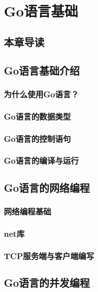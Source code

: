 \chapter{Go语言基础}

\section{本章导读}

\section{Go语言基础介绍}

\subsection{为什么使用Go语言？}

\subsection{Go语言的数据类型}

\subsection{Go语言的控制语句}

\subsection{Go语言的编译与运行}

\section{Go语言的网络编程}

\subsection{网络编程基础}

\subsection{net库}

\subsection{TCP服务端与客户端编写}

\section{Go语言的并发编程}

